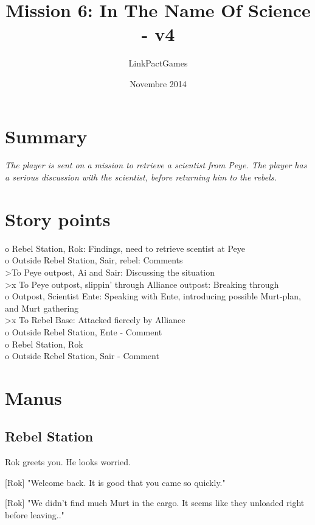 \documentclass[a4paper,12pt]{article}
\begin{document}
\title{Mission 6: In The Name Of Science - v4}
\author{LinkPactGames}
\date{Novembre 2014}
\maketitle

\section{Summary}

\textit{The player is sent on a mission to retrieve a scientist from Peye.
The player has a serious discussion with the scientist, before returning him
to the rebels.}

\section{Story points}

o Rebel Station, Rok: Findings, need to retrieve scentist at Peye\\
o Outside Rebel Station, Sair, rebel: Comments\\
\textgreater To Peye outpost, Ai and Sair: Discussing the situation\\
\textgreater x To Peye outpost, slippin' through Alliance outpost: Breaking through\\
o Outpost, Scientist Ente: Speaking with Ente, introducing possible Murt-plan, and Murt
gathering\\
\textgreater x To Rebel Base: Attacked fiercely by Alliance\\
o Outside Rebel Station, Ente - Comment\\
o Rebel Station, Rok\\
o Outside Rebel Station, Sair - Comment

\section{Manus}

\subsection{Rebel Station}

Rok greets you. He looks worried. 

[Rok] "Welcome back. It is good that you came so quickly."

[Rok] "We didn't find much Murt in the cargo. It seems like they unloaded right before leaving.."
\end{document}
